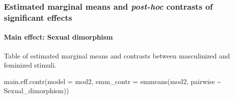 \documentclass[
  bookmarksnumbered]{article}
\newenvironment{Shaded}{\begin{snugshade}}{\end{snugshade}}
\newcommand{\AttributeTok}[1]{\textcolor[rgb]{0.80,0.80,0.80}{#1}}
\newcommand{\FunctionTok}[1]{\textcolor[rgb]{0.94,0.94,0.56}{#1}}
\newcommand{\NormalTok}[1]{\textcolor[rgb]{0.80,0.80,0.80}{#1}}
\newcommand{\SpecialCharTok}[1]{\textcolor[rgb]{0.86,0.64,0.64}{#1}}
\begin{document}
\begin{table}[H]
\centering
\caption{\label{tab:tab-mod2}ANOVA-type table of fixed effects for the TFD model}
\centering
{}
\end{table}

\subsubsection{\texorpdfstring{Estimated marginal means and \emph{post-hoc} contrasts of significant effects}{Estimated marginal means and post-hoc contrasts of significant effects}}\label{estimated-marginal-means-and-post-hoc-contrasts-of-significant-effects-1}

\paragraph{Main effect: Sexual dimorphism}\label{main-effect-sexual-dimorphism-1}

Table of estimated marginal means and contrasts between masculinized and feminized stimuli.

\begin{Shaded}
\begin{Highlighting}[]
\FunctionTok{main.eff.contr}\NormalTok{(}\AttributeTok{model =}\NormalTok{ mod2,}
               \AttributeTok{emm\_contr =} \FunctionTok{emmeans}\NormalTok{(mod2, pairwise }\SpecialCharTok{\textasciitilde{}}\NormalTok{ Sexual\_dimorphism))}
\end{Highlighting}
\end{Shaded}
\end{document}
